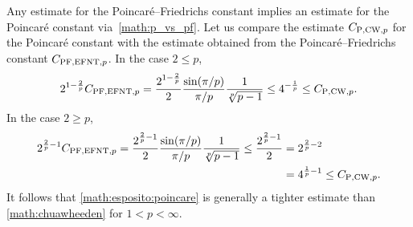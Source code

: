 \documentclass[10pt,letterpaper]{article}
\begin{document}
\begin{remark}
    Any estimate for the Poincar\'e--Friedrichs constant implies an estimate for the Poincar\'e constant via~\eqref{math:p_vs_pf}. 
    Let us compare the estimate $C_{{\rm P},{\rm CW},p}$ for the Poincar\'e constant
    with the estimate obtained from the Poincar\'e--Friedrichs constant $C_{{\rm PF},{\rm EFNT},p}$. 
    In the case $2 \leq p$, 
    \begin{align*}
        2^{1-\frac 2 p}
        C_{{\rm PF},{\rm EFNT},p}
        =
        \frac{ 2^{1-\frac 2 p} }{2}
        \frac{ \sin(\pi/p) }{ \pi/p }
        \frac{ 1 }{ \sqrt[p]{p-1} }
        \leq 
        4^{-\frac 1 p}
        \leq
        C_{{\rm P},{\rm CW},p} 
        .
    \end{align*}
    In the case $2 \geq p$, 
    \begin{align*}
        2^{\frac 2 p - 1}
        C_{{\rm PF},{\rm EFNT},p}
        =
        \frac{ 2^{\frac 2 p - 1} }{2}
        \frac{ \sin(\pi/p) }{ \pi/p }
        \frac{ 1 }{ \sqrt[p]{p-1} }
        \leq
        \frac{ 2^{\frac 2 p-1} }{2}
        &
        =
        2^{\frac 2 p - 2}
        \\&
        =
        4^{\frac 1 p - 1}
        \leq
        C_{{\rm P},{\rm CW},p} 
        .
    \end{align*}
    It follows that \eqref{math:esposito:poincare} is generally a tighter estimate than \eqref{math:chuawheeden} for $1 < p < \infty$.

\end{remark}
\end{document}
